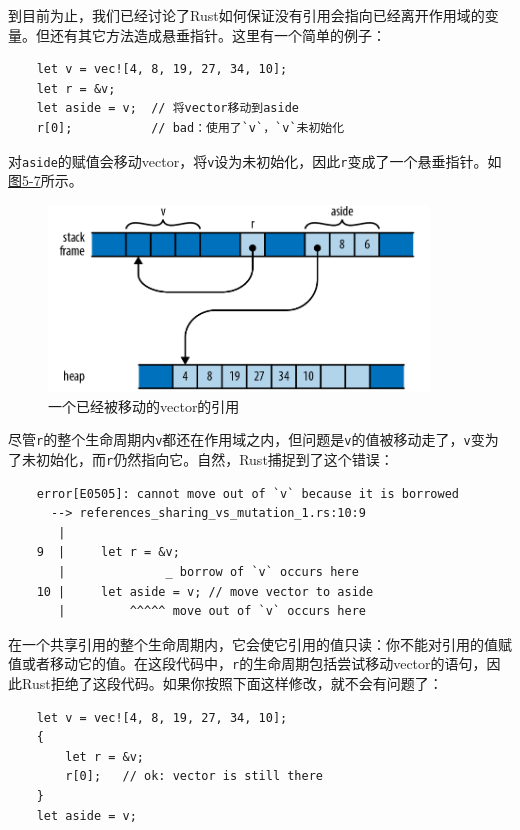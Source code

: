 到目前为止，我们已经讨论了Rust如何保证没有引用会指向已经离开作用域的变量。但还有其它方法造成悬垂指针。这里有一个简单的例子：
\begin{verbatim}
    let v = vec![4, 8, 19, 27, 34, 10];
    let r = &v;
    let aside = v;  // 将vector移动到aside
    r[0];           // bad：使用了`v`，`v`未初始化
\end{verbatim}

对\texttt{aside}的赋值会移动vector，将\texttt{v}设为未初始化，因此\texttt{r}变成了一个悬垂指针。如\hyperref[f5-7]{图5-7}所示。

\begin{figure}[htbp]
    \centering
    \includegraphics[width=0.9\textwidth]{../img/f5-7.png}
    \caption{一个已经被移动的vector的引用}
    \label{f5-7}
\end{figure}

尽管\texttt{r}的整个生命周期内\texttt{v}都还在作用域之内，但问题是\texttt{v}的值被移动走了，\texttt{v}变为了未初始化，而\texttt{r}仍然指向它。自然，Rust捕捉到了这个错误：
\begin{verbatim}
    error[E0505]: cannot move out of `v` because it is borrowed
      --> references_sharing_vs_mutation_1.rs:10:9
       |
    9  |     let r = &v;
       |              _ borrow of `v` occurs here
    10 |     let aside = v; // move vector to aside
       |         ^^^^^ move out of `v` occurs here
\end{verbatim}

在一个共享引用的整个生命周期内，它会使它引用的值只读：你不能对引用的值赋值或者移动它的值。在这段代码中，\texttt{r}的生命周期包括尝试移动vector的语句，因此Rust拒绝了这段代码。如果你按照下面这样修改，就不会有问题了：
\begin{verbatim}
    let v = vec![4, 8, 19, 27, 34, 10];
    {
        let r = &v;
        r[0];   // ok: vector is still there
    }
    let aside = v;
\end{verbatim}

